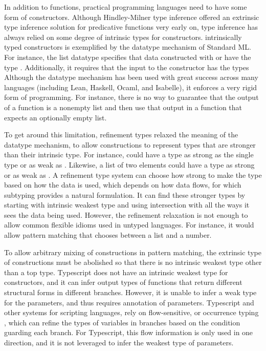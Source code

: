 \documentclass[acmsmall]{acmart}
\theoremstyle{definition}
\begin{document}
In addition to functions, practical programming languages need to have some form of constructors.
Although Hindley-Milner type inference offered an extrinsic type inference solution for predicative functions
very early on, type inference has always relied on some degree of intrinsic types for constructors.
intrinsically typed constructors is exemplified by the datatype mechanism of Standard ML.
For instance, the list datatype  specifies that 
data constructed with  or  have the type . Additionally,
it requires that the input to the constructor   has the types 
Although the datatype mechanism has been used with great success across many languages (including Lean, Haskell, Ocaml, and Isabelle),
it enforces a very rigid form of programming. For instance, there is no way to guarantee
that the output of a function is a nonempty list and then use that output in a function that expects an optionally empty list.

To get around this limitation, refinement types \cite{} relaxed the meaning of the datatype mechanism, to 
allow constructions to represent types that are stronger than their intrinsic type.
For instance,  could have a type as strong as the single type  or as weak as .
Likewise, a list of two elements  could have a type as strong 
or as weak as . 
A refinement type system can choose how strong to make the type based on how the data is used, 
which depends on how data flows, for which subtyping provides a natural formulation. 
It can find these stronger types by starting with intrinsic weakest type and using intersection with 
all the ways it sees the data being used.
However, the refinement relaxation is not enough to allow common flexible idioms used in untyped languages. 
For instance, it would allow pattern matching that chooses between a list and a number.

To allow arbitrary mixing of constructions in pattern matching, the extrinsic type of constructions
must be abolished so that there is no intrinsic weakest type other than a top type. 
Typescript \cite{} does not have an intrinsic weakest type for constructors,
and it can infer output types of functions that return different structural forms in different branches.
However, it is unable to infer a weak type for the parameters, and thus requires annotation of parameters.  
Typescript and other systems for scripting languages, rely on flow-sensitive, or occurrence typing \cite{},
which can refine the types of variables in branches based on the condition guarding each branch.
For Typescript, this flow information is only used in one direction, and it is not leveraged to infer
the weakest type of parameters.
\end{document}
